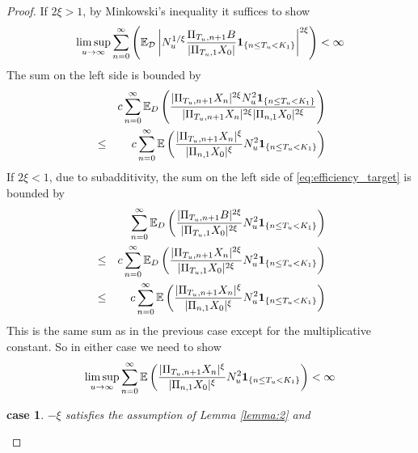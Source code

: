 \documentclass[aoas,preprint]{imsart}
\newtheorem{case}{case}
\numberwithin{equation}{section}
\theoremstyle{plain}
\begin{document}
\begin{proof}
  If $2 \xi > 1$, by Minkowski's inequality it suffices to show
  \begin{eqnarray*}
    \limsup_{u \to \infty}
    \sum_{n=0}^{\infty}
    \left(
      \mathbb{E}_{\mathcal D} \left|
        N_u^{1/\xi}
        \frac{
          \Pi_{T_u, n+1} B 
        }{
          |\Pi_{T_u, 1} X_0|
        }
        \mathbf{1}_{\{n \leq T_u < K_1\}}
      \right|^{2 \xi}
    \right)
    < \infty
  \end{eqnarray*}
  The sum on the left side is bounded by
  \begin{eqnarray*}
    && c \sum_{n=0}^\infty
    \mathbb{E}_D
    \left(
      {
        |\Pi_{T_u, n+1} X_n|^{2\xi}
        N_u^2
        \mathbf{1}_{\{n \leq T_u < K_1\}}
        \over
        |\Pi_{T_u, n+1} X_n|^{2\xi}
        |\Pi_{n,1} X_0|^{2\xi}
      }
    \right)\\
    &\leq&
    c \sum_{n=0}^\infty
    \mathbb{E}
    \left(
      {
        |\Pi_{T_u, n+1} X_n|^\xi
        \over
        |\Pi_{n,1} X_0|^{\xi}
      }
      N_u^2
      \mathbf{1}_{\{n \leq T_u < K_1\}}
    \right)
  \end{eqnarray*}
  If $2\xi < 1$, due to subadditivity, the sum on the left side of
  \eqref{eq:efficiency_target} is bounded by
  \begin{eqnarray*}
    && \sum_{n=0}^\infty
    \mathbb{E}_D \left(
      {
        | \Pi_{T_u, n+1} B |^{2\xi}
        \over
        | \Pi_{T_u, 1} X_0 |^{2\xi}
      }
      N_u^2
      \mathbf{1}_{\{n \leq T_u < K_1\}}
    \right) \\
    &\leq&
    c \sum_{n=0}^\infty
    \mathbb{E}_D \left(
      {
        | \Pi_{T_u, n+1} X_n |^{2\xi}
        \over
        | \Pi_{T_u, 1} X_0 |^{2\xi}
      }
      N_u^2
      \mathbf{1}_{\{n \leq T_u < K_1\}}
    \right) \\
    &\leq&
    c \sum_{n=0}^\infty
    \mathbb{E} \left(
      {
        | \Pi_{T_u, n+1} X_n |^{\xi}
        \over
        | \Pi_{n,1} X_0 |^{\xi}
      }
      N_u^2
      \mathbf{1}_{\{n \leq T_u < K_1\}}
    \right)
  \end{eqnarray*}
  This is the same sum as in the previous case except for the
  multiplicative constant. So in either case we need to show
  \begin{equation}
    \label{eq:rhjd}
    \limsup_{u \to \infty}
    \sum_{n=0}^\infty
    \mathbb{E} \left(
      {
        | \Pi_{T_u, n+1} X_n |^{\xi}
        \over
        | \Pi_{n,1} X_0 |^{\xi}
      }
      N_u^2
      \mathbf{1}_{\{n \leq T_u < K_1\}}
    \right) < \infty
  \end{equation}
  \begin{case}
    $-\xi$ satisfies the assumption of Lemma \ref{lemma:2} and

\end{case}
\end{proof}
\end{document}
